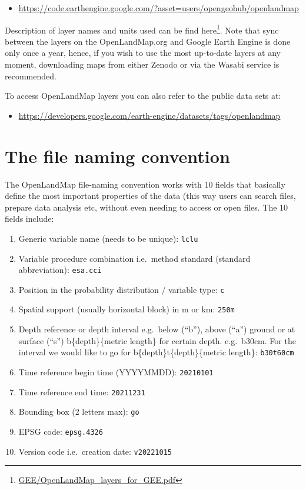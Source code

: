 \documentclass[
  graybox,natbib,nospthms]{svmono}
\providecommand{\tightlist}{%
  \setlength{\itemsep}{0pt}\setlength{\parskip}{0pt}}
\providecommand{\tightlist}{\setlength{\itemsep}{0pt}\setlength{\parskip}{0pt}}
\renewcommand{\href}[2]{#2 (\url{#1})}
\renewcommand{\href}[2]{#2\footnote{\url{#1}}}
\begin{document}
\begin{itemize}
\tightlist
\item
  \url{https://code.earthengine.google.com/?asset=users/opengeohub/openlandmap}
\end{itemize}

Description of layer names and units used can be find \href{GEE/OpenLandMap_layers_for_GEE.pdf}{here}.
Note that sync between the layers on the OpenLandMap.org and Google Earth Engine is done
only once a year, hence, if you wish to use the most up-to-date layers at any moment,
downloading maps from either Zenodo or via the Wasabi service is recommended.

To access OpenLandMap layers you can also refer to the public data sets at:

\begin{itemize}
\tightlist
\item
  \url{https://developers.google.com/earth-engine/datasets/tags/openlandmap}
\end{itemize}

\hypertarget{the-file-naming-convention}{%
\section{The file naming convention}\label{the-file-naming-convention}}

The OpenLandMap file-naming convention works with 10 fields that basically define the most important properties of the data (this way users can search files, prepare data analysis etc, without even needing to access or open files. The 10 fields include:

\begin{enumerate}
\def\labelenumi{\arabic{enumi}.}
\tightlist
\item
  Generic variable name (needs to be unique): \texttt{lclu}
\item
  Variable procedure combination i.e.~method standard (standard abbreviation): \texttt{esa.cci}
\item
  Position in the probability distribution / variable type: \texttt{c}
\item
  Spatial support (usually horizontal block) in m or km: \texttt{250m}
\item
  Depth reference or depth interval e.g.~below (``b''), above (``a'') ground or at surface (``s'') b\{depth\}\{metric length\} for certain depth. e.g.~b30cm. For the interval we would like to go for b\{depth\}t\{depth\}\{metric length\}: \texttt{b30t60cm}
\item
  Time reference begin time (YYYYMMDD): \texttt{20210101}
\item
  Time reference end time: \texttt{20211231}
\item
  Bounding box (2 letters max): \texttt{go}
\item
  EPSG code: \texttt{epsg.4326}
\item
  Version code i.e.~creation date: \texttt{v20221015}
\end{enumerate}
\end{document}
